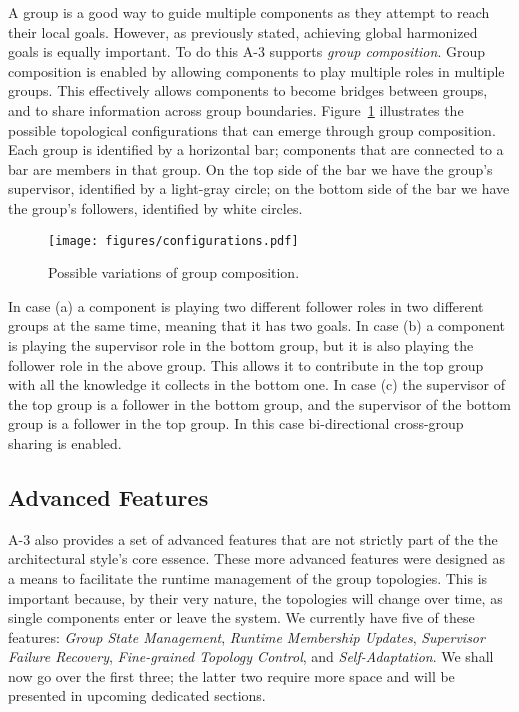 A group is a good way to guide multiple components as they attempt to reach their local goals. However, as previously stated, achieving global harmonized goals is equally important. To do this A-3 supports \emph{group composition}. Group composition is enabled by allowing components to play multiple roles in multiple groups. This effectively allows components to become bridges between groups, and to share information across group boundaries. Figure~\ref{fig:configurations} illustrates the possible topological configurations that can emerge through group composition. Each group is identified by a horizontal bar; components that are connected to a bar are members in that group. On the top side of the bar we have the group's supervisor, identified by a light-gray circle; on the bottom side of the bar we have the group's followers, identified by white circles.  

\begin{figure}[ht]
\centering
\texttt{[image: figures/configurations.pdf]}
\caption{Possible variations of group composition.}
\label{fig:configurations}
\end{figure}


In case (a) a component is playing two different follower roles in two different groups at the same time, meaning that it has two goals. In case (b) a component is playing the supervisor role in the bottom group, but it is also playing the follower role in the above group. This allows it to contribute in the top group with all the knowledge it collects in the bottom one. In case (c) the supervisor of the top group is a follower in the bottom group, and the supervisor of the bottom group is a follower in the top group. In this case bi-directional cross-group sharing is enabled. 

\subsection{Advanced Features}

A-3 also provides a set of advanced features that are not strictly part of the the architectural style's core essence. These more advanced features were designed as a means to facilitate the runtime management of the group topologies. This is important because, by their very nature, the topologies will change over time, as single components enter or leave the system. We currently have five of these features: \emph{Group State Management}, \emph{Runtime Membership Updates}, \emph{Supervisor Failure Recovery}, \emph{Fine-grained Topology Control}, and \emph{Self-Adaptation}. We shall now go over the first three; the latter two require more space and will be presented in upcoming dedicated sections.

